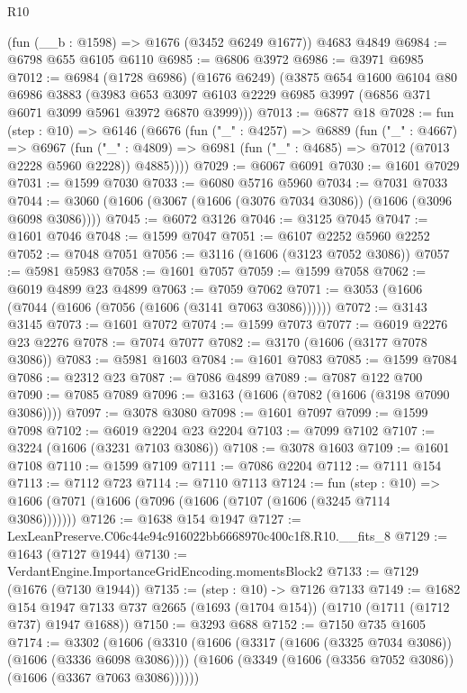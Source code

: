\begin{lexlean}{R10}
\begin{coremodule}
    (fun (__b : @1598) => @1676 (@3452 @6249 @1677))
    @4683
    @4849
@6984 := @6798 @655 @6105 @6110
@6985 := @6806 @3972
@6986 := @3971 @6985
@7012 := @6984
    (@1728 @6986)
    (@1676 @6249)
    (@3875
      @654
      @1600
      @6104
      @80
      @6986
      @3883
      (@3983 @653 @3097 @6103 @2229 @6985 @3997 (@6856 @371 @6071 @3099 @5961 @3972 @6870 @3999)))
@7013 := @6877 @18
@7028 := fun (step : @10) =>
  @6146
    (@6676
      (fun ("_" : @4257) =>
      @6889
        (fun ("_" : @4667) =>
        @6967
          (fun ("_" : @4809) =>
          @6981 (fun ("_" : @4685) => @7012 (@7013 @2228 @5960 @2228)) @4885))))
@7029 := @6067 @6091
@7030 := @1601 @7029
@7031 := @1599 @7030
@7033 := @6080 @5716 @5960
@7034 := @7031 @7033
@7044 := @3060 (@1606 (@3067 (@1606 (@3076 @7034 @3086)) (@1606 (@3096 @6098 @3086))))
@7045 := @6072 @3126
@7046 := @3125 @7045
@7047 := @1601 @7046
@7048 := @1599 @7047
@7051 := @6107 @2252 @5960 @2252
@7052 := @7048 @7051
@7056 := @3116 (@1606 (@3123 @7052 @3086))
@7057 := @5981 @5983
@7058 := @1601 @7057
@7059 := @1599 @7058
@7062 := @6019 @4899 @23 @4899
@7063 := @7059 @7062
@7071 := @3053 (@1606 (@7044 (@1606 (@7056 (@1606 (@3141 @7063 @3086))))))
@7072 := @3143 @3145
@7073 := @1601 @7072
@7074 := @1599 @7073
@7077 := @6019 @2276 @23 @2276
@7078 := @7074 @7077
@7082 := @3170 (@1606 (@3177 @7078 @3086))
@7083 := @5981 @1603
@7084 := @1601 @7083
@7085 := @1599 @7084
@7086 := @2312 @23
@7087 := @7086 @4899
@7089 := @7087 @122 @700
@7090 := @7085 @7089
@7096 := @3163 (@1606 (@7082 (@1606 (@3198 @7090 @3086))))
@7097 := @3078 @3080
@7098 := @1601 @7097
@7099 := @1599 @7098
@7102 := @6019 @2204 @23 @2204
@7103 := @7099 @7102
@7107 := @3224 (@1606 (@3231 @7103 @3086))
@7108 := @3078 @1603
@7109 := @1601 @7108
@7110 := @1599 @7109
@7111 := @7086 @2204
@7112 := @7111 @154
@7113 := @7112 @723
@7114 := @7110 @7113
@7124 := fun (step : @10) =>
  @1606 (@7071 (@1606 (@7096 (@1606 (@7107 (@1606 (@3245 @7114 @3086)))))))
@7126 := @1638 @154 @1947
@7127 := LexLeanPreserve.C06c44e94c916022bb6668970c400c1f8.R10.__fits_8
@7129 := @1643 (@7127 @1944)
@7130 := VerdantEngine.ImportanceGridEncoding.momentsBlock2
@7133 := @7129 (@1676 (@7130 @1944))
@7135 := (step : @10) -> @7126 @7133
@7149 := @1682
    @154
    @1947
    @7133
    @737
    @2665
    (@1693 (@1704 @154))
    (@1710 (@1711 (@1712 @737) @1947 @1688))
@7150 := @3293 @688
@7152 := @7150 @735 @1605
@7174 := @3302
    (@1606
      (@3310
        (@1606 (@3317 (@1606 (@3325 @7034 @3086)) (@1606 (@3336 @6098 @3086))))
        (@1606 (@3349 (@1606 (@3356 @7052 @3086)) (@1606 (@3367 @7063 @3086))))))

\end{coremodule}
\end{lexlean}

